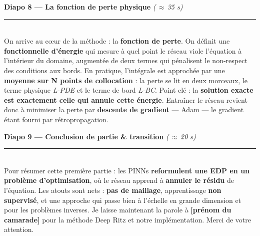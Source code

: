 \documentclass[11pt]{article}
\newcommand{\diapo}[3]{%
  \vspace{10pt}%
  {\sffamily\bfseries\color{bblue}\large Diapo #1 — #2}%
  \hfill{\sffamily\small\color{dblue}\itshape (#3)}\\[-2pt]
  {\color{bblue}\rule{\linewidth}{0.8pt}}\\[4pt]}
\newcommand{\key}[1]{\textbf{#1}}
\begin{document}
\diapo{8}{La fonction de perte physique}{\,$\approx$\,35 s}
On arrive au cœur de la méthode : la \key{fonction de perte}. On définit une
\key{fonctionnelle d'énergie} qui mesure à quel point le réseau viole l'équation à
l'intérieur du domaine, augmentée de deux termes qui pénalisent le non-respect des
conditions aux bords. En pratique, l'intégrale est approchée par une \key{moyenne
sur N points de collocation} : la perte se lit en deux morceaux, le terme physique
\emph{L-PDE} et le terme de bord \emph{L-BC}. Point clé : la \key{solution exacte
est exactement celle qui annule cette énergie}. Entraîner le réseau revient donc à
minimiser la perte par \key{descente de gradient} — Adam — le gradient étant
fourni par rétropropagation.

\diapo{9}{Conclusion de partie \& transition}{\,$\approx$\,20 s}
Pour résumer cette première partie : les PINNs \key{reformulent une EDP en un
problème d'optimisation}, où le réseau apprend à \key{annuler le résidu} de
l'équation. Les atouts sont nets : \key{pas de maillage}, apprentissage
\key{non supervisé}, et une approche qui passe bien à l'échelle en grande
dimension et pour les problèmes inverses. Je laisse maintenant la parole à
\key{[prénom du camarade]} pour la méthode Deep Ritz et notre implémentation.
Merci de votre attention.
\end{document}
